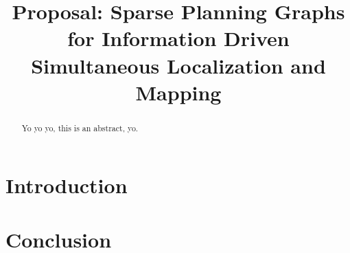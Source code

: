 \documentclass[conference]{IEEEtran}
\begin{document}
\title{Proposal: Sparse Planning Graphs for Information Driven Simultaneous Localization and Mapping}
\author{
}

\maketitle

\begin{abstract}
\boldmath
Yo yo yo, this is an abstract, yo.
\end{abstract}

\IEEEpeerreviewmaketitle

\section{Introduction}
\section{Conclusion}
\end{document}
